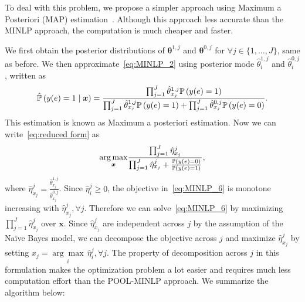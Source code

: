 To deal with this problem, we propose a simpler approach using Maximum a Posteriori (MAP) estimation~\cite{trove.nla.gov.au/work/9892361}. 
Although this approach less accurate than the MINLP approach, the computation is much cheaper and faster.

We first obtain the posterior distributions of $\bm{\theta}^{1, j}$ and $\bm{\theta}^{0, j}$ for $\forall j \in \{1, \ldots, J\}$, same as before.
We then approximate~\eqref{eq:MINLP_2} using posterior mode $\hat{\theta}^{1,j}_i$ and $\hat{\theta}^{0,j}_i$, written as 
\begin{equation*}
  \hat{\mathbb{P}} \left(y(e \right) = 1 \mid \bm{x}) = \frac{\prod_{j=1}^J \hat{\theta}^{1, j}_{x_j} \mathbb{P}\left( y(e)=1 \right)}{\prod_{j=1}^J \hat{\theta}^{1, j}_{x_j} \mathbb{P}\left( y(e)=1 \right) + \prod_{j=1}^J \hat{\theta}^{0, j}_{x_j} \mathbb{P}\left( y(e)=0 \right)}.
\end{equation*}
This estimation is known as Maximum a posteriori estimation. Now we can write~\eqref{eq:reduced form} as 
\begin{equation}
  \underset{\bm{x}}{\arg\max} \frac{\prod_{j=1}^J \hat{\eta}^j_{x_j}}{\prod_{j=1}^J \hat{\eta}^j_{x_j} + \frac{\mathbb{P} \left(y(e) = 0 \right)}{\mathbb{P} \left( y(e) = 1 \right)}},
  \label{eq:MINLP_6}
\end{equation}
where $\hat{\eta}^j_{x_j} = \frac{\hat{\theta}^{1,j}_{x_j}}{\hat{\theta}^{0,j}_{x_j}}$. Since $\hat{\eta}^j_i \geq 0$, the objective 
in~\eqref{eq:MINLP_6} is monotone increasing with $\hat{\eta}^j_{x_j}, \forall j$. Therefore we can solve~\eqref{eq:MINLP_6} by
maximizing $\prod_{j=1}^J \hat{\eta}^j_{x_j}$ over $\bm{x}$. Since $\hat{\eta}^j_{x_j}$ are independent across $j$ by the assumption of the 
Na{\"i}ve Bayes model, we can decompose the objective across $j$ and maximize $\hat{\eta}^j_{x_j}$ by setting 
$x_j = \underset{i}{\arg\max} \, \hat{\eta}^j_i, \forall j$. The property of decomposition across $j$ in this formulation makes the
optimization problem a lot easier and requires much less computation effort than the POOL-MINLP approach. We summarize the algorithm below:
